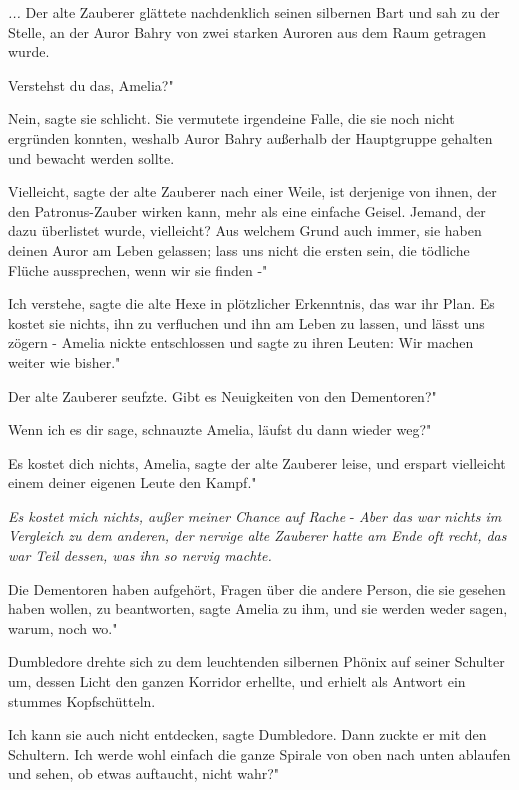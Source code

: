 \emph{...}
Der alte Zauberer glättete nachdenklich seinen silbernen Bart und sah zu der
Stelle, an der Auror Bahry von zwei starken Auroren aus dem Raum getragen wurde.

\glqq{}Verstehst du das, Amelia?"

\glqq{}Nein\grqq{}, sagte sie schlicht. Sie vermutete irgendeine Falle, die sie
noch nicht ergründen konnten, weshalb Auror Bahry außerhalb der Hauptgruppe
gehalten und bewacht werden sollte.

\glqq{}Vielleicht\grqq{}, sagte der alte Zauberer nach einer Weile, \glqq{}ist
derjenige von ihnen, der den Patronus-Zauber wirken kann, mehr als eine einfache
Geisel. Jemand, der dazu überlistet wurde, vielleicht? Aus welchem Grund auch
immer, sie haben deinen Auror am Leben gelassen; lass uns nicht die ersten sein,
die tödliche Flüche aussprechen, wenn wir sie finden -"

\glqq{}Ich verstehe\grqq{}, sagte die alte Hexe in plötzlicher Erkenntnis, \glqq{}
das war ihr Plan. Es kostet sie nichts, ihn zu verfluchen und ihn am Leben zu
lassen, und lässt uns zögern -\grqq{} Amelia nickte entschlossen und sagte zu
ihren Leuten: \glqq{}Wir machen weiter wie bisher."

Der alte Zauberer seufzte. \glqq{}Gibt es Neuigkeiten von den Dementoren?"

\glqq{}Wenn ich es dir sage\grqq{}, schnauzte Amelia, \glqq{}läufst du dann wieder
weg?"

\glqq{}Es kostet dich nichts, Amelia\grqq{}, sagte der alte Zauberer leise, \glqq{}
und erspart vielleicht einem deiner eigenen Leute den Kampf."

\emph{Es kostet mich nichts, außer meiner Chance auf Rache} - \emph{Aber das war
nichts im Vergleich zu dem anderen, der nervige alte Zauberer hatte am Ende oft
recht, das war Teil dessen, was ihn so nervig machte.}

\glqq{}Die Dementoren haben aufgehört, Fragen über die andere Person, die sie
gesehen haben wollen, zu beantworten\grqq{}, sagte Amelia zu ihm, \glqq{}und sie
werden weder sagen, warum, noch wo."

Dumbledore drehte sich zu dem leuchtenden silbernen Phönix auf seiner Schulter
um, dessen Licht den ganzen Korridor erhellte, und erhielt als Antwort ein
stummes Kopfschütteln.

\glqq{}Ich kann sie auch nicht entdecken\grqq{}, sagte Dumbledore. Dann zuckte er
mit den Schultern. \glqq{}Ich werde wohl einfach die ganze Spirale von oben nach
unten ablaufen und sehen, ob etwas auftaucht, nicht wahr?"


